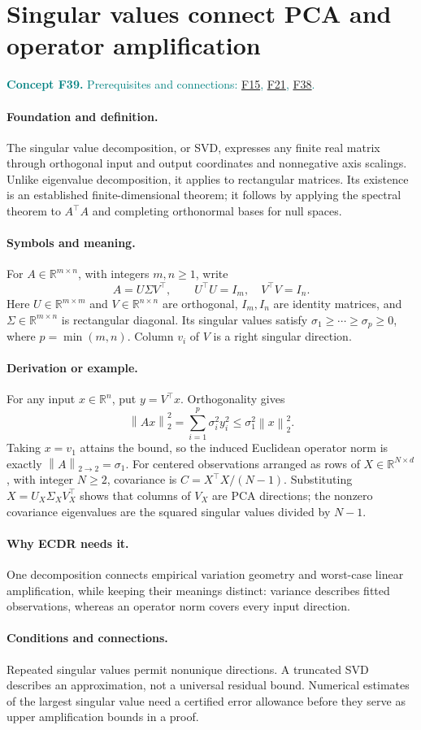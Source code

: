 \documentclass[11pt,a4paper]{article}
\newcommand{\R}{\mathbb R}
\newcommand{\norm}[1]{\left\lVert#1\right\rVert}
\newcommand{\conceptid}{Front matter}
\newcommand{\concept}[3]{\clearpage\renewcommand{\conceptid}{#1}%
\section{#2}\label{concept:#1}%
\textcolor{teal}{\textbf{Concept #1.} Prerequisites and connections: #3.}\par
\typeout{ECDR-CONCEPT-START #1 PAGE=\thepage}}
\begin{document}
\concept{F39}{Singular values connect PCA and operator amplification}{\hyperref[concept:F15]{F15}, \hyperref[concept:F21]{F21}, \hyperref[concept:F38]{F38}}
\paragraph{Foundation and definition.}
The singular value decomposition, or SVD, expresses any finite real
matrix through orthogonal input and output coordinates and nonnegative
axis scalings. Unlike eigenvalue decomposition, it applies to rectangular
matrices. Its existence is an established finite-dimensional theorem;
it follows by applying the spectral theorem to $A^\top A$ and
completing orthonormal bases for null spaces.
\paragraph{Symbols and meaning.}
For $A\in\R^{m\times n}$, with integers $m,n\ge1$, write
\[
 A=U\Sigma V^\top,\qquad U^\top U=I_m,\quad V^\top V=I_n.
\]
Here $U\in\R^{m\times m}$ and $V\in\R^{n\times n}$ are
orthogonal, $I_m,I_n$ are identity matrices, and
$\Sigma\in\R^{m\times n}$ is rectangular diagonal. Its singular
values satisfy $\sigma_1\ge\cdots\ge\sigma_p\ge0$, where
$p=\min(m,n)$. Column $v_i$ of $V$ is a right singular direction.
\paragraph{Derivation or example.}
For any input $x\in\R^n$, put $y=V^\top x$. Orthogonality gives
\[
 \norm{Ax}_2^2=\sum_{i=1}^{p}\sigma_i^2y_i^2
 \le\sigma_1^2\norm{x}_2^2.
\]
Taking $x=v_1$ attains the bound, so the induced Euclidean operator
norm is exactly $\norm{A}_{2\to2}=\sigma_1$.
For centered observations arranged as rows of
$X\in\R^{N\times d}$, with integer $N\ge2$, covariance is
$C=X^\top X/(N-1)$. Substituting $X=U_X\Sigma_XV_X^\top$ shows
that columns of $V_X$ are PCA directions; the nonzero covariance
eigenvalues are the squared singular values divided by $N-1$.
\paragraph{Why ECDR needs it.}
One decomposition connects empirical variation geometry and worst-case
linear amplification, while keeping their meanings distinct: variance
describes fitted observations, whereas an operator norm covers every
input direction.
\paragraph{Conditions and connections.}
Repeated singular values permit nonunique directions. A truncated SVD
describes an approximation, not a universal residual bound. Numerical
estimates of the largest singular value need a certified error allowance
before they serve as upper amplification bounds in a proof.
\par\label{endconcept:F39}
\end{document}
